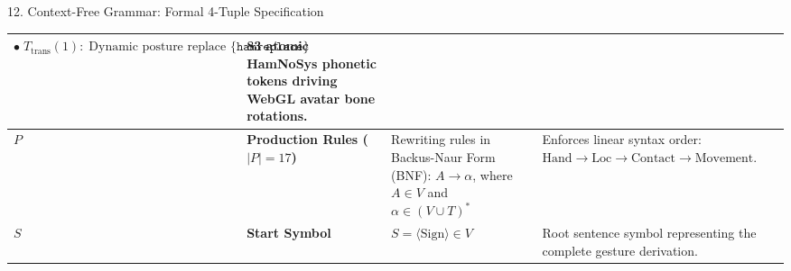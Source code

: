 \documentclass[aspectratio=169,xcolor={table,dvipsnames}]{beamer}
\begin{document}
\begin{frame}[t]{12. Context-Free Grammar: Formal 4-Tuple Specification}
{\begin{tabular}{|>{\centering\arraybackslash\bfseries}p{0.8cm}|>{\raggedright\arraybackslash\bfseries}p{2.3cm}|>{\raggedright\arraybackslash}p{6.4cm}|>{\raggedright\arraybackslash}p{3.0cm}|}
    $\bullet\; T_{\text{trans}} (1):\; \text{Dynamic posture replace } \{\texttt{hamreplace}\}$ & 
    83 atomic HamNoSys phonetic tokens driving WebGL avatar bone rotations. \\
    \hline
    \rowcolor{lightyellow} 
    $P$ & Production Rules ($|P|=17$) & 
    Rewriting rules in Backus-Naur Form (BNF): $A \to \alpha$, where $A \in V$ and $\alpha \in (V \cup T)^*$ & 
    Enforces linear syntax order: $\text{Hand} \to \text{Loc} \to \text{Contact} \to \text{Movement}$. \\
    \hline
    \rowcolor{lightorange} 
    $S$ & Start Symbol & 
    $S = \langle\text{Sign}\rangle \in V$ & 
    Root sentence symbol representing the complete gesture derivation. \\
    \hline
\end{tabular}
}

\vspace{1.2mm}
\end{frame}
\end{document}
